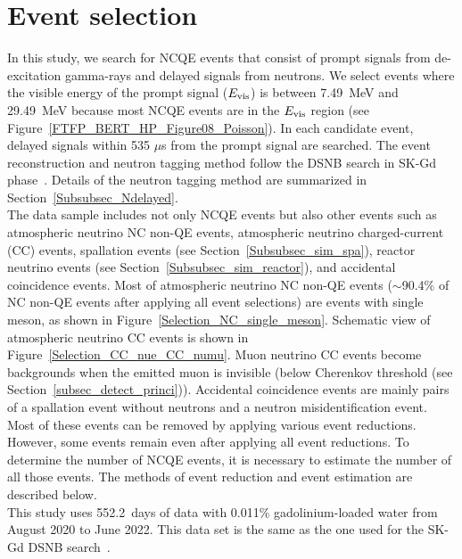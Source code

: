 

\section{Event selection}\label{Section_Selection}
\vs\hs
In this study, we search for NCQE events that consist of prompt signals from de-excitation gamma-rays and delayed signals from neutrons.
We select events where the visible energy of the prompt signal ($E_{{\rm vis}}$) is between 7.49~MeV and 29.49~MeV because most NCQE events are in the $E_{{\rm vis}}$ region (see Figure~\ref{FTFP_BERT_HP_Figure08_Poisson}).
In each candidate event, delayed signals within 535 $\mu$s from the prompt signal are searched.
The event reconstruction and neutron tagging method follow the DSNB search in SK-Gd phase~\cite{2023Harada,2022Harada}.
Details of the neutron tagging method are summarized in Section~\ref{Subsubsec_Ndelayed}.\\
\hs
The data sample includes not only NCQE events but also other events such as atmospheric neutrino NC non-QE events, atmospheric neutrino charged-current (CC) events, spallation events (see Section~\ref{Subsubsec_sim_spa}), reactor neutrino events (see Section~\ref{Subsubsec_sim_reactor}), and accidental coincidence events.
Most of atmospheric neutrino NC non-QE events ($\sim$90.4\% of NC non-QE events after applying all event selections) are events with single meson, as shown in Figure~\ref{Selection_NC_single_meson}.
Schematic view of atmospheric neutrino CC events is shown in Figure~\ref{Selection_CC_nue_CC_numu}.
Muon neutrino CC events become backgrounds when the emitted muon is invisible (below Cherenkov threshold (see Section~\ref{subsec_detect_princi})).
Accidental coincidence events are mainly pairs of a spallation event without neutrons and a neutron misidentification event.
Most of these events can be removed by applying various event reductions.
However, some events remain even after applying all event reductions.
To determine the number of NCQE events, it is necessary to estimate the number of all those events.
The methods of event reduction and event estimation are described below.\\
\hs
This study uses 552.2~days of data with 0.011\% gadolinium-loaded water from August 2020 to June 2022.
This data set is the same as the one used for the SK-Gd DSNB search~\cite{2023Harada}.

